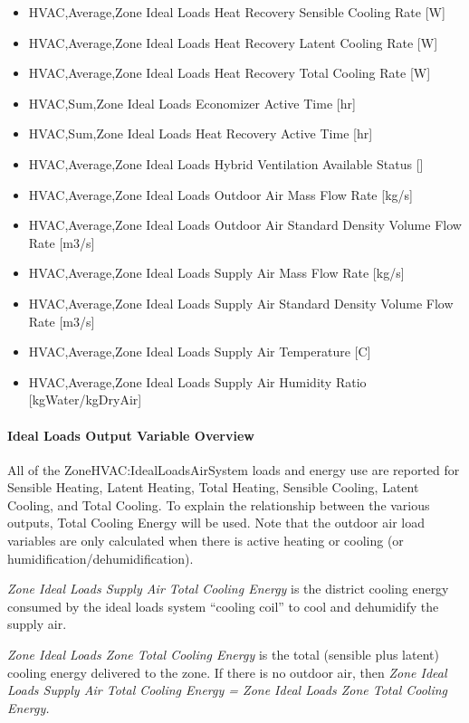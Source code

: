 \begin{itemize}
\item
  HVAC,Average,Zone Ideal Loads Heat Recovery Sensible Cooling Rate {[}W{]}
\item
  HVAC,Average,Zone Ideal Loads Heat Recovery Latent Cooling Rate {[}W{]}
\item
  HVAC,Average,Zone Ideal Loads Heat Recovery Total Cooling Rate {[}W{]}
\item
  HVAC,Sum,Zone Ideal Loads Economizer Active Time {[}hr{]}
\item
  HVAC,Sum,Zone Ideal Loads Heat Recovery Active Time {[}hr{]}
\item
  HVAC,Average,Zone Ideal Loads Hybrid Ventilation Available Status {[]}
\item
  HVAC,Average,Zone Ideal Loads Outdoor Air Mass Flow Rate {[}kg/s{]}
\item
  HVAC,Average,Zone Ideal Loads Outdoor Air Standard Density Volume Flow Rate {[}m3/s{]}
\item
  HVAC,Average,Zone Ideal Loads Supply Air Mass Flow Rate {[}kg/s{]}
\item
  HVAC,Average,Zone Ideal Loads Supply Air Standard Density Volume Flow Rate {[}m3/s{]}
\item
  HVAC,Average,Zone Ideal Loads Supply Air Temperature {[}C{]}
\item
  HVAC,Average,Zone Ideal Loads Supply Air Humidity Ratio {[}kgWater/kgDryAir{]}      
\end{itemize}

\paragraph{Ideal Loads Output Variable Overview}\label{ideal-loads-output-variable-overview}

All of the ZoneHVAC:IdealLoadsAirSystem loads and energy use are reported for Sensible Heating, Latent Heating, Total Heating, Sensible Cooling, Latent Cooling, and Total Cooling. To explain the relationship between the various outputs, Total Cooling Energy will be used. Note that the outdoor air load variables are only calculated when there is active heating or cooling (or humidification/dehumidification).

\emph{Zone Ideal Loads Supply Air Total Cooling Energy} is the district cooling energy consumed by the ideal loads system ``cooling coil'' to cool and dehumidify the supply air.

\emph{Zone Ideal Loads Zone Total Cooling Energy} is the total (sensible plus latent) cooling energy delivered to the zone. If there is no outdoor air, then \emph{Zone Ideal Loads Supply Air Total Cooling Energy = Zone Ideal Loads Zone Total Cooling Energy.}

